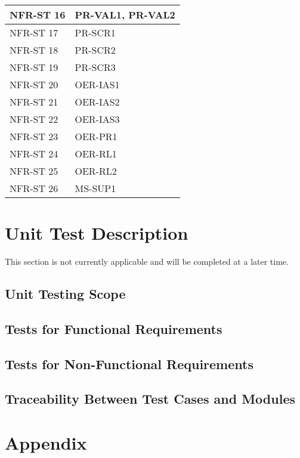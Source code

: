 \documentclass[12pt, titlepage]{article}
\begin{document}
\begin{longtable}{|p{6.0cm}|p{8.0cm}|}
  NFR-ST 16 & PR-VAL1, PR-VAL2 \\ \hline
  NFR-ST 17 & PR-SCR1 \\ \hline
  NFR-ST 18 & PR-SCR2 \\ \hline
  NFR-ST 19 & PR-SCR3 \\ \hline
  NFR-ST 20 & OER-IAS1 \\ \hline
  NFR-ST 21 & OER-IAS2 \\ \hline
  NFR-ST 22 & OER-IAS3 \\ \hline
  NFR-ST 23 & OER-PR1 \\ \hline
  NFR-ST 24 & OER-RL1 \\ \hline
  NFR-ST 25 & OER-RL2 \\ \hline
  NFR-ST 26 & MS-SUP1 \\
  \bottomrule
\end{longtable}

\section{Unit Test Description}
\label{Unit Test Desc}
This section is not currently applicable and will be completed at a later time. 
\subsection{Unit Testing Scope}

\subsection{Tests for Functional Requirements}


\subsection{Tests for Non-Functional Requirements}


\subsection{Traceability Between Test Cases and Modules}


\newpage





\newpage

\section{Appendix}
\end{document}

